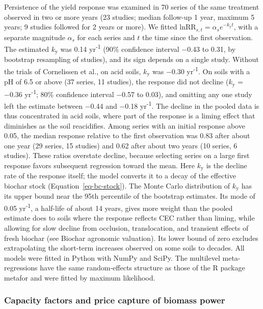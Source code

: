 \documentclass[
  letterpaper,
  twoside,
  twocolumn,
  9pt]{article}
\begin{document}
Persistence of the yield response was examined in 70 series of the same
treatment observed in two or more years (23 studies; median follow-up 1
year, maximum 5 years; 9 studies followed for 2 years or more). We
fitted \(\mathrm{lnRR}_{s,t} = \alpha_s e^{-k_{\mathrm{y}} t}\), with a
separate magnitude \(\alpha_s\) for each series and \(t\) the time since
the first observation. The estimated \(k_{\mathrm{y}}\) was 0.14
yr\textsuperscript{-1} (90\% confidence interval −0.43 to 0.31, by
bootstrap resampling of studies), and its sign depends on a single
study. Without the trials of Cornelissen et al.\citep{cornelissen2013},
on acid soils, \(k_{\mathrm{y}}\) was −0.30 yr\textsuperscript{-1}. On
soils with a pH of 6.5 or above (37 series, 11 studies), the response
did not decline (\(k_{\mathrm{y}}\) = −0.36 yr\textsuperscript{-1}; 80\%
confidence interval −0.57 to 0.03), and omitting any one study left the
estimate between −0.44 and −0.18 yr\textsuperscript{-1}. The decline in
the pooled data is thus concentrated in acid soils, where part of the
response is a liming effect that diminishes as the soil reacidifies.
Among series with an initial response above 0.05, the median response
relative to the first observation was 0.83 after about one year (29
series, 15 studies) and 0.62 after about two years (10 series, 6
studies). These ratios overstate decline, because selecting series on a
large first response favors subsequent regression toward the mean. Here
\(k_{\mathrm{y}}\) is the decline rate of the response itself; the model
converts it to a decay of the effective biochar stock
(Equation~\ref{eq-bc-stock}). The Monte Carlo distribution of
\(k_{\mathrm{y}}\) has its upper bound near the 95th percentile of the
bootstrap estimates. Its mode of 0.05 yr\textsuperscript{-1}, a
half-life of about 14 years, gives more weight than the pooled estimate
does to soils where the response reflects CEC rather than liming, while
allowing for slow decline from occlusion, translocation, and transient
effects of fresh biochar (see Biochar agronomic valuation). Its lower
bound of zero excludes extrapolating the short-term increases observed
on some soils to decades. All models were fitted in Python with NumPy
and SciPy.\citep{harris2020, virtanen2020} The multilevel
meta-regressions have the same random-effects structure as those of the
R package metafor \citep{viechtbauer2010} and were fitted by maximum
likelihood.

\subsubsection{Capacity factors and price capture of biomass
power}\label{capacity-factors-and-price-capture-of-biomass-power}
\end{document}
